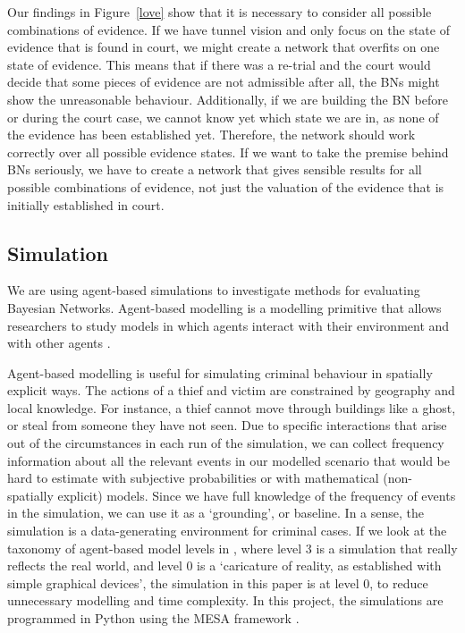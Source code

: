 \documentclass[12pt]{article}
\begin{document}
Our findings in Figure~\ref{love} show that it is necessary to consider all possible combinations of evidence. If we have tunnel vision and only focus on the state of evidence that is found in court, we might create a network that overfits on one state of evidence. This means that if there was a re-trial and the court would decide that some pieces of evidence are not admissible after all, the BNs might show the unreasonable behaviour. Additionally, if we are building the BN before or during the court case, we cannot know yet which state we are in, as none of the evidence has been established yet. Therefore, the network should work correctly over all possible evidence states. If we want to take the premise behind BNs seriously, we have to create a network that gives sensible results for all possible combinations of evidence, not just the valuation of the evidence that is initially established in court.

\subsection{Simulation}

We are using agent-based simulations to investigate methods for evaluating Bayesian Networks. Agent-based modelling is a modelling primitive that allows researchers to study models in which agents interact with their environment and with other agents \citep{gilbert2000}. 

Agent-based modelling is useful for simulating criminal behaviour in spatially explicit ways. The actions of a thief and victim are constrained by geography and local knowledge. For instance, a thief cannot move through buildings like a ghost, or steal from someone they have not seen. Due to specific interactions that arise out of the circumstances in each run of the simulation, we can collect frequency information about all the relevant events in our modelled scenario that would be hard to estimate with subjective probabilities or with mathematical (non-spatially explicit) models. Since we have full knowledge of the frequency of events in the simulation, we can use it as a `grounding', or baseline. In a sense, the simulation is a data-generating environment for criminal cases. If we look at the taxonomy of agent-based model levels in \citep{gilbert2005}, where level 3 is a simulation that really reflects the real world, and level 0 is a `caricature of reality, as established with simple graphical devices', the simulation in this paper is at level 0, to reduce unnecessary modelling and time complexity. In this project, the simulations are programmed in Python using the MESA framework  \citep{mesa2020}.
\end{document}

